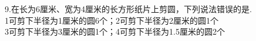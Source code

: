 9.在长为6厘米、宽为4厘米的长方形纸片上剪圆，下列说法错误的是\key{\qquad}.\\

\textcircled{\small{1}}可剪下半径为1厘米的圆6个；\qquad\textcircled{\small{2}}可剪下半径为2厘米的圆1个\\

\textcircled{\small{3}}可剪下半径为3厘米的圆1个；\qquad\textcircled{\small{4}}可剪下半径为1.5厘米的圆2个



